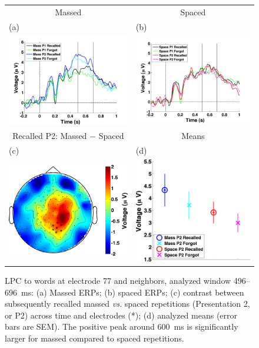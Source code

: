 \begin{figure}[hp]
  \centering
  \begin{tabular}{cc}
  Massed & Spaced \\
  \multicolumn{1}{l}{(a)} & \multicolumn{1}{l}{(b)} \\
  \includegraphics[width=.35\textwidth]{./figs/exp1/tla_single_ga_word_RgH_rc_mass_p1_word_RgH_fo_mass_p1_word_RgH_rc_mass_p2_word_RgH_fo_mass_p2_E62_E72_E76_E77_E78_E84_E85_-200_1000_legend_xylabel} &
  \includegraphics[width=.35\textwidth]{./figs/exp1/tla_single_ga_word_RgH_rc_spac_p1_word_RgH_fo_spac_p1_word_RgH_rc_spac_p2_word_RgH_fo_spac_p2_E62_E72_E76_E77_E78_E84_E85_-200_1000_legend_xylabel} \\
  Recalled P2: Massed $-$ Spaced & Means \\
  \multicolumn{1}{l}{(c)} & \multicolumn{1}{l}{(d)} \\
  \includegraphics[width=.29\textwidth]{./figs/exp1/tla_topocont_ga_word_RgH_rc_mass_p2vsword_RgH_rc_spac_p2_E62_E72_E76_E77_E78_E84_E85_496_696_-2p0_2p0_cb} &
  \includegraphics[width=.30\textwidth]{./figs/exp1/tla_line_ga_word_RgH_rc_mass_p2_word_RgH_fo_mass_p2_word_RgH_rc_spac_p2_word_RgH_fo_spac_p2_E62_E72_E76_E77_E78_E84_E85_496_696_ylabel} \\
  \end{tabular}
  \caption{LPC to words at electrode 77 and neighbors, analyzed window 496--696~ms: (a) Massed ERPs; (b) spaced ERPs; (c) contrast between subsequently recalled massed \textit{vs.} spaced repetitions (Presentation 2, or P2) across time and electrodes (*); (d) analyzed means (error bars are SEM).  The positive peak around 600~ms is significantly larger for massed compared to spaced repetitions.}
  \label{fig:LPC}
\end{figure}

